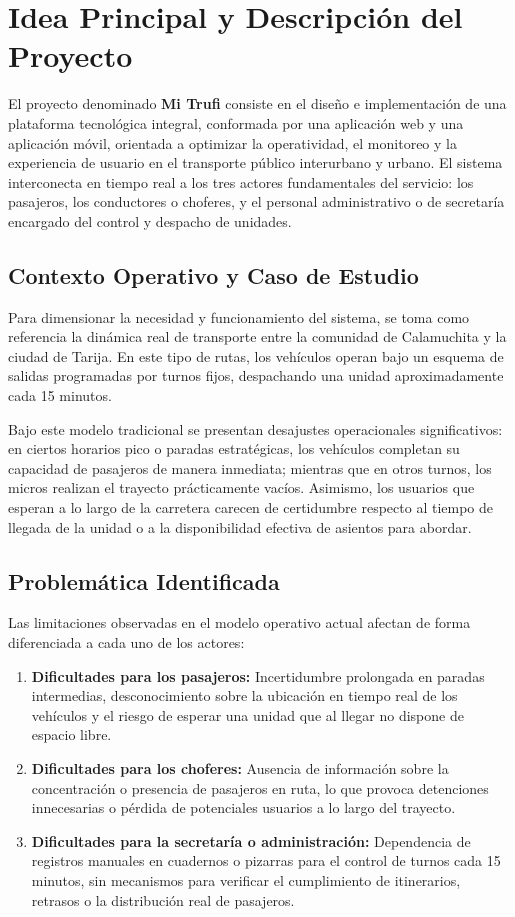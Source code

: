 \section{Idea Principal y Descripción del Proyecto}

El proyecto denominado \textbf{Mi Trufi} consiste en el diseño e implementación de una plataforma tecnológica integral, conformada por una aplicación web y una aplicación móvil, orientada a optimizar la operatividad, el monitoreo y la experiencia de usuario en el transporte público interurbano y urbano. El sistema interconecta en tiempo real a los tres actores fundamentales del servicio: los pasajeros, los conductores o choferes, y el personal administrativo o de secretaría encargado del control y despacho de unidades.

\subsection{Contexto Operativo y Caso de Estudio}

Para dimensionar la necesidad y funcionamiento del sistema, se toma como referencia la dinámica real de transporte entre la comunidad de Calamuchita y la ciudad de Tarija. En este tipo de rutas, los vehículos operan bajo un esquema de salidas programadas por turnos fijos, despachando una unidad aproximadamente cada 15 minutos. 

Bajo este modelo tradicional se presentan desajustes operacionales significativos: en ciertos horarios pico o paradas estratégicas, los vehículos completan su capacidad de pasajeros de manera inmediata; mientras que en otros turnos, los micros realizan el trayecto prácticamente vacíos. Asimismo, los usuarios que esperan a lo largo de la carretera carecen de certidumbre respecto al tiempo de llegada de la unidad o a la disponibilidad efectiva de asientos para abordar.

\subsection{Problemática Identificada}

Las limitaciones observadas en el modelo operativo actual afectan de forma diferenciada a cada uno de los actores:

\begin{enumerate}[label=\alph*)]
    \item \textbf{Dificultades para los pasajeros:} Incertidumbre prolongada en paradas intermedias, desconocimiento sobre la ubicación en tiempo real de los vehículos y el riesgo de esperar una unidad que al llegar no dispone de espacio libre.
    \item \textbf{Dificultades para los choferes:} Ausencia de información sobre la concentración o presencia de pasajeros en ruta, lo que provoca detenciones innecesarias o pérdida de potenciales usuarios a lo largo del trayecto.
    \item \textbf{Dificultades para la secretaría o administración:} Dependencia de registros manuales en cuadernos o pizarras para el control de turnos cada 15 minutos, sin mecanismos para verificar el cumplimiento de itinerarios, retrasos o la distribución real de pasajeros.
\end{enumerate}

